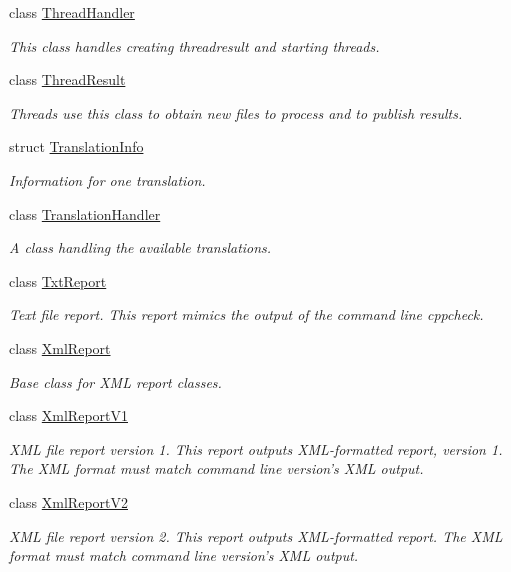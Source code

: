 \begin{DoxyCompactItemize}
class \hyperlink{class_thread_handler}{Thread\-Handler}
\begin{DoxyCompactList}\small\item\em This class handles creating threadresult and starting threads. \end{DoxyCompactList}\item 
class \hyperlink{class_thread_result}{Thread\-Result}
\begin{DoxyCompactList}\small\item\em Threads use this class to obtain new files to process and to publish results. \end{DoxyCompactList}\item 
struct \hyperlink{struct_translation_info}{Translation\-Info}
\begin{DoxyCompactList}\small\item\em Information for one translation. \end{DoxyCompactList}\item 
class \hyperlink{class_translation_handler}{Translation\-Handler}
\begin{DoxyCompactList}\small\item\em A class handling the available translations. \end{DoxyCompactList}\item 
class \hyperlink{class_txt_report}{Txt\-Report}
\begin{DoxyCompactList}\small\item\em Text file report. This report mimics the output of the command line cppcheck. \end{DoxyCompactList}\item 
class \hyperlink{class_xml_report}{Xml\-Report}
\begin{DoxyCompactList}\small\item\em Base class for X\-M\-L report classes. \end{DoxyCompactList}\item 
class \hyperlink{class_xml_report_v1}{Xml\-Report\-V1}
\begin{DoxyCompactList}\small\item\em X\-M\-L file report version 1. This report outputs X\-M\-L-\/formatted report, version 1. The X\-M\-L format must match command line version's X\-M\-L output. \end{DoxyCompactList}\item 
class \hyperlink{class_xml_report_v2}{Xml\-Report\-V2}
\begin{DoxyCompactList}\small\item\em X\-M\-L file report version 2. This report outputs X\-M\-L-\/formatted report. The X\-M\-L format must match command line version's X\-M\-L output. \end{DoxyCompactList}\end{DoxyCompactItemize}
